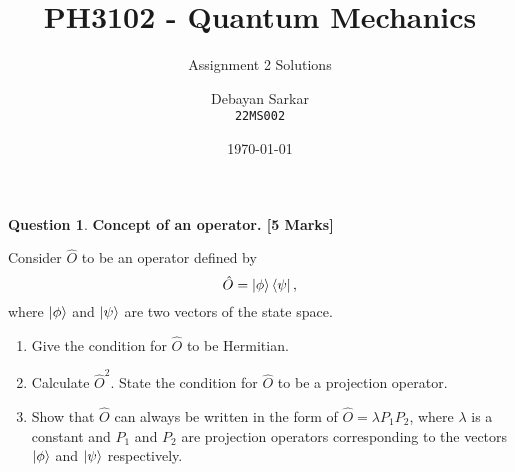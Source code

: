 \documentclass[10pt]{scrartcl}
\title{PH3102 - Quantum Mechanics}
\subtitle{Assignment 2 Solutions}
\author{Debayan Sarkar \\ \texttt{22MS002}}
\date{\today}
\theoremstyle{definition}
\newtheorem{exercise}{Question}
\begin{document}
\maketitle
\begin{exercise}\textbf{Concept of an operator. [5 Marks]}

    Consider $\hat{O}$ to be an operator defined by $$\hat{O} = \ket{\phi}\bra{\psi},$$ where $\ket{\phi}$ and $\ket{\psi}$ are 
two vectors of the state space.
    \begin{enumerate}[label={(\alph*)}]
        \item Give the condition for $\hat{O}$ to be Hermitian.
        \item Calculate $\hat{O}^2$. State the condition for $\hat{O}$ to be a projection operator.
        \item Show that $\hat{O}$ can always be written in the form of $\hat{O} = \lambda P_1 P_2 $, where $\lambda$
            is a constant and $P_1$ and $P_2$ are projection operators corresponding to the vectors $\ket{\phi}$ and $\ket{\psi}$
            respectively.
    \end{enumerate}
\end{exercise}
 
\end{document}

